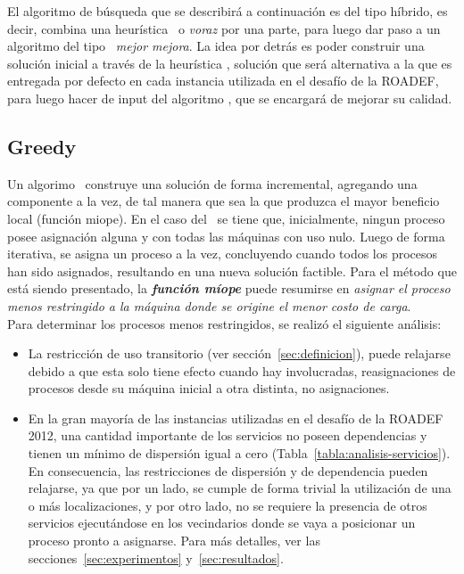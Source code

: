 \documentclass[../informe2.tex]{subfiles}
\begin{document}
El algoritmo de búsqueda que se describirá a continuación es del tipo híbrido, es decir, combina una heurística \greedy\ o \textit{voraz} por una parte, para luego dar paso a un algoritmo del tipo \hillc\ \textit{mejor mejora}. La idea por detrás es poder construir una solución inicial a través de la heurística \greedy, solución que será alternativa a la que es entregada por defecto en cada instancia utilizada en el desafío de la ROADEF, para luego hacer de input del algoritmo \hillc, que se encargará de mejorar su calidad.
\subsection{Greedy}
Un algorimo \greedy\ construye una solución de forma incremental, agregando una componente a la vez, de tal manera que sea la que produzca el mayor beneficio local (función miope). En el caso del \mrp\ se tiene que, inicialmente, ningun proceso posee asignación alguna y con todas las máquinas con uso nulo. Luego de forma iterativa, se asigna un proceso a la vez, concluyendo cuando todos los procesos han sido asignados, resultando en una nueva solución factible. Para el método que está siendo presentado, la \textbf{\textit{función míope}} puede resumirse en \textit{asignar el proceso menos restringido a la máquina donde se origine el menor costo de carga}. \\
Para determinar los procesos menos restringidos, se realizó el siguiente análisis:
\begin{itemize}
	\item La restricción de uso transitorio (ver sección~\ref{sec:definicion}), puede relajarse debido a que esta solo tiene efecto cuando hay involucradas, reasignaciones de procesos desde su máquina inicial a otra distinta, no asignaciones.
	\item En la gran mayoría de las instancias utilizadas en el desafío de la ROADEF 2012, una cantidad importante de los servicios no poseen dependencias y tienen un mínimo de dispersión igual a cero (Tabla~\ref{tabla:analisis-servicios}). En consecuencia, las restricciones de dispersión y de dependencia pueden relajarse, ya que por un lado, se cumple de forma trivial la utilización de una o más localizaciones, y por otro lado, no se requiere la presencia de otros servicios ejecutándose en los vecindarios donde se vaya a posicionar un proceso pronto a asignarse. Para más detalles, ver las secciones~\ref{sec:experimentos} y~\ref{sec:resultados}.
\end{itemize}
\end{document}
